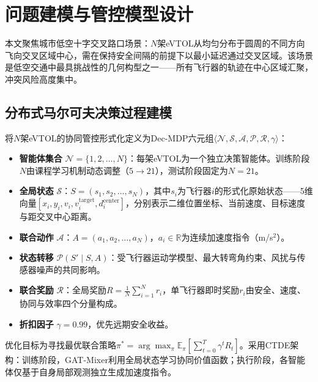 \documentclass[12pt,a4paper,UTF8]{ctexart}
\begin{document}
\section{问题建模与管控模型设计}

本文聚焦城市低空十字交叉路口场景：$N$架eVTOL从均匀分布于圆周的不同方向飞向交叉区域中心，需在保持安全间隔的前提下以最小延迟通过交叉区域。该场景是低空交通中最具挑战性的几何构型之一——所有飞行器的轨迹在中心区域汇聚，冲突风险高度集中。

\subsection{分布式马尔可夫决策过程建模}

将$N$架eVTOL的协同管控形式化定义为Dec-MDP六元组$\langle \mathcal{N}, \mathcal{S}, \mathcal{A}, \mathcal{P}, \mathcal{R}, \gamma \rangle$：

\begin{itemize}
    \item \textbf{智能体集合} $\mathcal{N} = \{1, 2, \ldots, N\}$：每架eVTOL为一个独立决策智能体。训练阶段$N$由课程学习机制动态调整（$5\to21$），测试阶段固定为$N=21$。
    \item \textbf{全局状态} $\mathcal{S}$：$S = (s_1, s_2, \ldots, s_N)$，其中$s_i$为飞行器$i$的形式化原始状态——5维向量$[x_i, y_i, v_i, v_i^{\text{target}}, d_i^{\text{center}}]$，分别表示二维位置坐标、当前速度、目标速度与距交叉中心距离。
    \item \textbf{联合动作} $\mathcal{A}$：$A = (a_1, a_2, \ldots, a_N)$，$a_i \in \mathbb{R}$为连续加速度指令（m/s$^2$）。
    \item \textbf{状态转移} $\mathcal{P}(S' \mid S, A)$：受飞行器运动学模型、最大转弯角约束、风扰与传感器噪声的共同影响。
    \item \textbf{联合奖励} $\mathcal{R}$：全局奖励$R = \frac{1}{N}\sum_{i=1}^{N} r_i$，单飞行器即时奖励$r_i$由安全、速度、协同与效率四个分量构成。
    \item \textbf{折扣因子} $\gamma = 0.99$，优先远期安全收益。
\end{itemize}

优化目标为寻找最优联合策略$\pi^* = \arg\max_\pi \mathbb{E}_{\pi}\left[\sum_{t=0}^{T} \gamma^t R_t\right]$。采用CTDE架构：训练阶段，GAT-Mixer利用全局状态学习协同价值函数；执行阶段，各智能体仅基于自身局部观测独立生成加速度指令。
\end{document}
